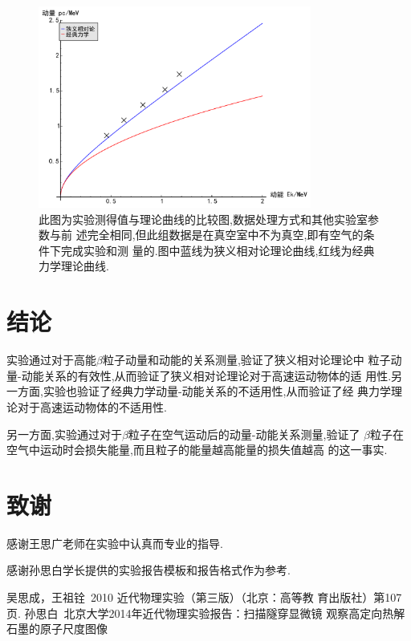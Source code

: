 \documentclass[aps,pre,12pt,preprint,onecolumn,showpacs,showkeys]{revtex4-1}
\begin{document}
\begin{figure}[htbp]
  \centering
\includegraphics[width=0.8\textwidth]{plot3.pdf}
\caption{\label{fig:plot3}%
此图为实验测得值与理论曲线的比较图,数据处理方式和其他实验室参数与前
述完全相同,但此组数据是在真空室中不为真空,即有空气的条件下完成实验和测
量的.图中蓝线为狭义相对论理论曲线,红线为经典力学理论曲线.}
\end{figure}


\section{结论}

实验通过对于高能$\beta$粒子动量和动能的关系测量,验证了狭义相对论理论中
粒子动量-动能关系的有效性,从而验证了狭义相对论理论对于高速运动物体的适
用性.另一方面,实验也验证了经典力学动量-动能关系的不适用性,从而验证了经
典力学理论对于高速运动物体的不适用性.

另一方面,实验通过对于$\beta$粒子在空气运动后的动量-动能关系测量,验证了
$\beta$粒子在空气中运动时会损失能量,而且粒子的能量越高能量的损失值越高
的这一事实.

\section{致谢}

感谢王思广老师在实验中认真而专业的指导.

感谢孙思白学长提供的实验报告模板和报告格式作为参考.

\begin{thebibliography}{}
 吴思成，王祖铨~2010 近代物理实验（第三版）（北京：高等教
育出版社）第107页.  %
 孙思白~北京大学2014年近代物理实验报告：扫描隧穿显微镜
  观察高定向热解石墨的原子尺度图像
\end{thebibliography}
\end{document}
